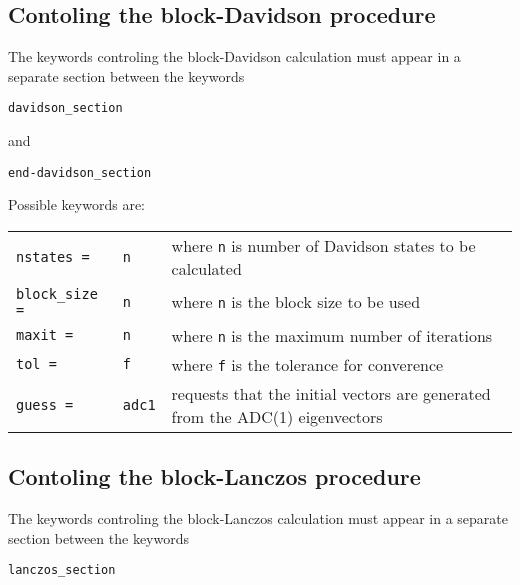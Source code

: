 \documentclass[12pt]{article}
\newcommand*\code[1]{\mbox{\texttt{{#1}}}} %
\begin{document}
\subsection*{Contoling the block-Davidson procedure}
\noindent
The keywords controling the block-Davidson calculation must appear in
a separate section between the keywords

\vspace{0.2cm}
\code{davidson\_section}

\vspace{0.2cm}
\noindent
and

\vspace{0.2cm}
\code{end-davidson\_section}

\vspace{0.2cm}
\noindent
Possible keywords are:

\begin{table}[h]
\vspace*{1.7ex}
\begin{center}
\begin{tabular}{llp{2.5in}}
\code{nstates =} & \code{n}   & where \code{n} is number of Davidson states to be calculated \\
\vspace{0.2cm}
\code{block\_size =} & \code{n} & where \code{n} is the block size to be used \\
\vspace{0.2cm}
\code{maxit =} & \code{n} & where \code{n} is the maximum number of iterations \\ 
\vspace{0.2cm}
\code{tol =} & \code{f} & where \code{f} is the tolerance for converence \\
\vspace{0.2cm}
\code{guess =} & \code{adc1} & requests that the initial vectors are generated from the ADC(1) eigenvectors \\
\end{tabular}
\end{center}
\end{table}

\subsection*{Contoling the block-Lanczos procedure}
\noindent
The keywords controling the block-Lanczos calculation must appear in
a separate section between the keywords

\vspace{0.2cm}
\code{lanczos\_section}
\end{document}
